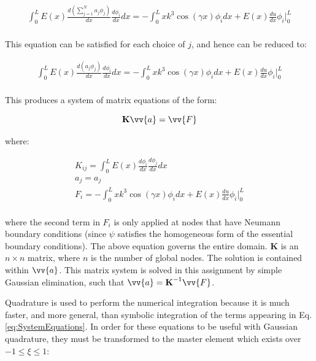 \documentclass[10pt]{article}
\begin{document}
\begin{equation}
\begin{aligned}
\int_{0}^{L}E(x)\frac{d\left(\sum_{j=1}^{N}a_j\phi_j\right)}{dx}\frac{d\phi_i}{dx}dx=-\int_{0}^{L}xk^3\cos{(\gamma x)}\phi_idx+E(x)\frac{du}{dx}\phi_i\biggr\vert_{0}^{L}\\
\end{aligned}
\end{equation}

This equation can be satisfied for each choice of \(j\), and hence can be reduced to:

\begin{equation}
\begin{aligned}
\int_{0}^{L}E(x)\frac{d\left(a_j\phi_j\right)}{dx}\frac{d\phi_i}{dx}dx=-\int_{0}^{L}xk^3\cos{(\gamma x)}\phi_idx+E(x)\frac{du}{dx}\phi_i\biggr\vert_{0}^{L}\\
\end{aligned}
\end{equation}

This produces a system of matrix equations of the form:

\begin{equation}
\label{eq:MatrixEqn}
\textbf{K}\vv{a}=\vv{F}
\end{equation}

where:

\begin{equation}
\begin{aligned}
\label{eq:SystemEquations}
K_{ij}=\int_{0}^{L}E(x)\frac{d\phi_i}{dx}\frac{d\phi_j}{dx}dx\\
a_j=a_j\\
F_i=-\int_{0}^{L}xk^3\cos{(\gamma x)}\phi_idx+E(x)\frac{du}{dx}\phi_i\biggr\vert_{0}^{L}\\
\end{aligned}
\end{equation}

where the second term in \(F_i\) is only applied at nodes that have Neumann boundary conditions (since \(\psi\) satisfies the homogeneous form of the essential boundary conditions). The above equation governs the entire domain. \(\textbf{K}\) is an \(n \times n\) matrix, where \(n\) is the number of global nodes. The solution is contained within \(\vv{a}\). This matrix system is solved in this assignment by simple Gaussian elimination, such that \(\vv{a}=\textbf{K}^{-1}\vv{F}\).

Quadrature is used to perform the numerical integration because it is much faster, and more general, than symbolic integration of the terms appearing in Eq. \eqref{eq:SystemEquations}. In order for these equations to be useful with Gaussian quadrature, they must be transformed to the master element which exists over \(-1\leq\xi\leq1\):
\end{document}

